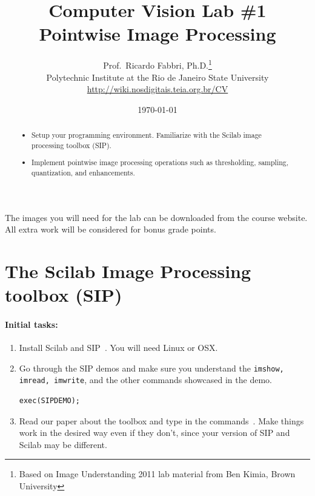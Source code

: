 \documentclass[a4paper]{article}
\begin{document}
\title{\textsf{Computer Vision Lab \#1\\ Pointwise Image Processing}
} 

\author{Prof.\ Ricardo Fabbri, Ph.D.\footnote{Based on Image Understanding
2011 lab material from Ben Kimia, Brown University}\\[1em]
Polytechnic Institute at the Rio de Janeiro State University\\
\url{http://wiki.nosdigitais.teia.org.br/CV}
}
 

\date{\today}
\maketitle
\begin{abstract}
\noindent\begin{itemize}
\item Setup your programming environment. Familiarize with the Scilab image
processing toolbox (SIP).
\item Implement pointwise image processing operations such as thresholding,
sampling, quantization, and enhancements.
\end{itemize}
\end{abstract}
\vspace{2em}



The images you will need for the lab can be downloaded from the course
website. All extra work will be considered for bonus grade points.

\section{The Scilab Image Processing toolbox (SIP)}

\paragraph{Initial tasks:}
\begin{enumerate}
\item Install Scilab and SIP~\cite{scilab,Fabbri:etal:Arxiv2012}. You will need Linux or OSX.
\item Go through the SIP demos and make sure you understand the \texttt{imshow, imread,
imwrite}, and the other commands showcased in the demo.
\begin{lstlisting}[numbers=none]
exec(SIPDEMO);
\end{lstlisting}
\item Read our paper about the toolbox and type in the commands~\cite{Fabbri:etal:Arxiv2012}.
Make things work in the desired way even if they don't, since your version of
SIP and Scilab may be different.
\end{enumerate}
\end{document}
